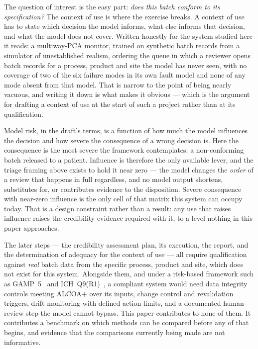 \documentclass[11pt]{article}
\begin{document}
The question of interest is the easy part: \emph{does this batch conform to its
specification?} The context of use is where the exercise breaks. A context of use
has to state which decision the model informs, what else informs that decision,
and what the model does not cover. Written honestly for the system studied here
it reads: a multiway-PCA monitor, trained on synthetic batch records from a
simulator of unestablished realism, ordering the queue in which a reviewer opens
batch records for a process, product and site the model has never seen, with no
coverage of two of the six failure modes in its own fault model and none of any
mode absent from that model. That is narrow to the point of being nearly vacuous,
and writing it down is what makes it obvious --- which is the argument for
drafting a context of use at the start of such a project rather than at its
qualification.

Model risk, in the draft's terms, is a function of how much the model influences
the decision and how severe the consequence of a wrong decision is. Here the
consequence is the most severe the framework contemplates: a non-conforming batch
released to a patient. Influence is therefore the only available lever, and the
triage framing above exists to hold it near zero --- the model changes the
\emph{order} of a review that happens in full regardless, and no model output
shortens, substitutes for, or contributes evidence to the disposition. Severe
consequence with near-zero influence is the only cell of that matrix this system
can occupy today. That is a design constraint rather than a result: any use that
raises influence raises the credibility evidence required with it, to a level
nothing in this paper approaches.

The later steps --- the credibility assessment plan, its execution, the report,
and the determination of adequacy for the context of use --- all require
qualification against \emph{real} batch data from the specific process, product
and site, which does not exist for this system. Alongside them, and under a
risk-based framework such as GAMP~5~\citep{ispe2022gamp5} and
ICH~Q9(R1)~\citep{ich2023q9r1}, a compliant system would need data integrity
controls meeting ALCOA+ over its inputs, change control and revalidation
triggers, drift monitoring with defined action limits, and a documented human
review step the model cannot bypass. This paper contributes to none of them. It
contributes a benchmark on which methods can be compared before any of that
begins, and evidence that the comparisons currently being made are not
informative.
\end{document}
